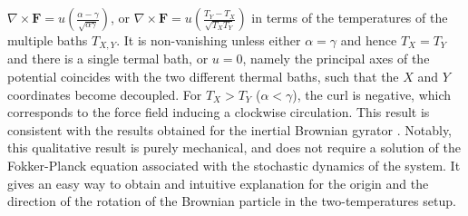 $\nabla \times \mathbf{F} = u\left({\frac{\alpha-\gamma}{\sqrt{\alpha\gamma}}}\right)$, or $\nabla\times\mathbf{F}=u\left(\frac{T_Y - T_X}{\sqrt{T_X T_Y}}\right)$ in terms of the temperatures of the multiple baths $T_{X,Y}$.
It is non-vanishing unless either  $\alpha = \gamma$ and hence $T_X = T_Y$ and there is a single termal bath, or $u=0$, namely the principal axes of the potential coincides with the two different thermal baths, such that the $X$ and $Y$ coordinates become decoupled. For $T_X>T_Y$ ($\alpha<\gamma$), the curl is negative, which corresponds to the force field inducing a clockwise circulation. This result is consistent with the results obtained for the inertial Brownian gyrator \cite{mancois2018two, bae2021inertial}. Notably, this qualitative result is purely mechanical, and does not require a solution of the Fokker-Planck equation associated with the stochastic dynamics of the system. It gives an easy way to obtain and intuitive explanation for the origin and the direction of the rotation of the Brownian particle in the two-temperatures setup. 

